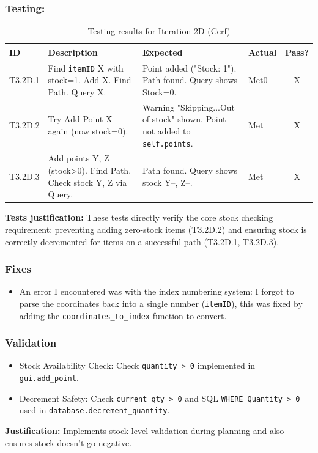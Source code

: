 \subsubsection{Testing:}
\begin{table}[htbp]
	\centering
	\begin{tabularx}{\textwidth}{|l|X|p{4.5cm}|p{1.5cm}|c|}
		\hline
		\textbf{ID} & \textbf{Description} & \textbf{Expected} & \textbf{Actual} & \textbf{Pass?} \\
		\hline
		T3.2D.1 & Find \verb|itemID| X with stock=1. Add X. Find Path. Query X. & Point added ("Stock: 1"). Path found. Query shows Stock=0. & Met0 & X \\
		\hline
		T3.2D.2 & Try Add Point X again (now stock=0). & Warning "Skipping...Out of stock" shown. Point not added to \verb|self.points|. & Met & X \\
		\hline
		T3.2D.3 & Add points Y, Z (stock>0). Find Path. Check stock Y, Z via Query. & Path found. Query shows stock Y--, Z--. & Met & X \\
		\hline
	\end{tabularx}
	\caption{Testing results for Iteration 2D (Cerf)}
\end{table}
\textbf{Tests justification:} These tests directly verify the core stock checking requirement: preventing adding zero-stock items (T3.2D.2) and ensuring stock is correctly decremented for items on a successful path (T3.2D.1, T3.2D.3).

\subsubsection{Fixes}
\begin{itemize}
	\item An error I encountered was with the index numbering system: I forgot to parse the coordinates back into a single number (\verb|itemID|), this was fixed by adding the \verb*|coordinates_to_index| function to convert.
\end{itemize}

\subsubsection{Validation}
\begin{itemize}
	\item Stock Availability Check: Check \verb|quantity > 0| implemented in \verb|gui.add_point|.
	\item Decrement Safety: Check \verb|current_qty > 0| and SQL \verb|WHERE Quantity > 0| used in \verb|database.decrement_quantity|.
\end{itemize}
\textbf{Justification:} Implements stock level validation during planning and also ensures stock doesn't go negative.



